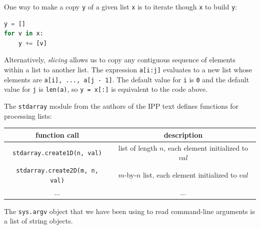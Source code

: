 \documentclass[8pt,a4paper,compress,handout]{beamer}
\begin{document}
\begin{frame}[fragile]
One way to make a copy \lstinline{y} of a given list \lstinline{x} is to iterate though \lstinline{x} to build \lstinline{y}:
\begin{lstlisting}[language=Python]
y = []
for v in x:
    y += [v]
\end{lstlisting}

\bigskip

Alternatively, \emph{slicing} allows us to copy any contiguous sequence of elements within a list to another list. The expression \lstinline{a[i:j]} evaluates to a new list whose elements are \lstinline{a[i], ..., a[j - 1]}. The default value for \lstinline{i} is \lstinline{0} and the default value for \lstinline{j} is \lstinline{len(a)}, so \lstinline{y = x[:]} is equivalent to the code above.

\bigskip

The \lstinline{stdarray} module from the authors of the IPP text defines functions for processing lists:

\begin{center}
\begin{tabular}{cc}
function call & description \\ \hline
\lstinline$stdarray.create1D(n, val)$ & list of length $n$, each element initialized to $val$ \\
\lstinline$stdarray.create2D(m, n, val)$ & $m$-by-$n$ list, each element initialized to $val$ \\
$\dots$ & $\dots$
\end{tabular} 
\end{center}

\bigskip

The \lstinline{sys.argv} object that we have been using to read command-line arguments is a list of string objects.
\end{frame}
\end{document}
